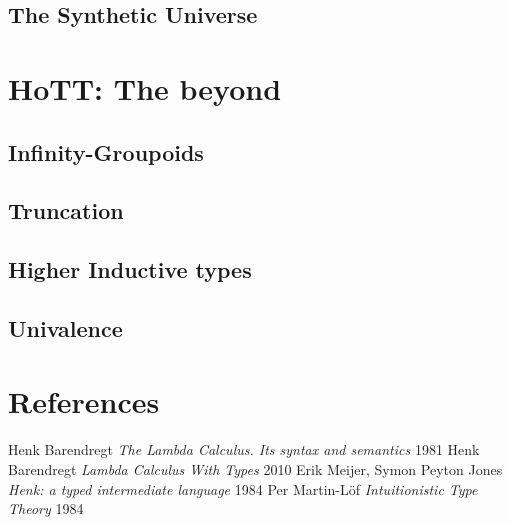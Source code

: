 \documentclass[11pt,oneside]{article}
\begin{document}
\subsection{The Synthetic Universe}

\section{HoTT: The beyond}
\subsection{Infinity-Groupoids}
\subsection{Truncation}
\subsection{Higher Inductive types}
\subsection{Univalence}

\newpage
\section{References}
\begin{thebibliography}{9}

      Henk Barendregt \textit{The Lambda Calculus. Its syntax and semantics} 1981
      Henk Barendregt \textit{Lambda Calculus With Types} 2010
       Erik Meijer, Symon Peyton Jones \textit{Henk: a typed intermediate language} 1984
        Per Martin-Löf \textit{Intuitionistic Type Theory} 1984

\end{thebibliography}
\end{document}
